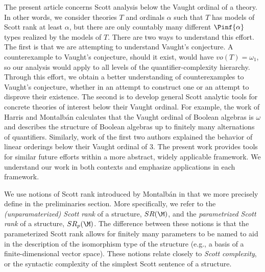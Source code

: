 \documentclass{amsart}
\renewcommand{\-}{\text{-}}
\begin{document}
The present article concerns Scott analysis below the Vaught ordinal of a theory.
In other words, we consider theories $T$ and ordinals $\alpha$ such that $T$ has models of Scott rank at least $\alpha$, but there are only countably many different $\Pinf{\alpha}$ types realized by the models of $T$.
There are two ways to understand this effort.
The first is that we are attempting to understand Vaught's conjecture.
A counterexample to Vaught's conjecture, should it exist, would have $vo(T)=\omega_1$, so our analysis would apply to all levels of the quantifier-complexity hierarchy.
Through this effort, we obtain a better understanding of counterexamples to Vaught's conjecture, whether in an attempt to construct one or an attempt to disprove their existence.
The second is to develop general Scott analytic tools for concrete theories of interest below their Vaught ordinal.
For example, the work of Harris and Montalbán \cite{HM} calculates that the Vaught ordinal of Boolean algebras is $\omega$ and describes the structure of Boolean algebras up to finitely many alternations of quantifiers.
Similarly, work of the first two authors \cite{GR24} explained the behavior of linear orderings below their Vaught ordinal of 3.
The present work provides tools for similar future efforts within a more abstract, widely applicable framework.
We understand our work in both contexts and emphasize applications in each framework.

We use notions of Scott rank introduced by Montalbán in \cite{MonSR} that we more precisely define in the preliminaries section.
More specifically, we refer to the \emph{(unparamaterized) Scott rank} of a structure, $SR(\M)$, and the \emph{parametrized Scott rank} of a structure, $SR_p(\M)$.
The difference between these notions is that the parameterized Scott rank allows for finitely many parameters to be named to aid in the description of the isomorphism type of the structure (e.g., a basis of a finite-dimensional vector space).
These notions relate closely to \emph{Scott complexity}, or the syntactic complexity of the simplest Scott sentence of a structure.
\end{document}
